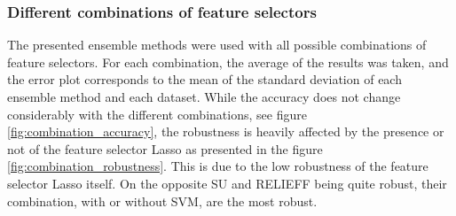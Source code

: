 \documentclass[twoside,11pt]{article}
\begin{document}

\subsubsection{Different combinations of feature selectors}
The presented ensemble methods were used with all possible combinations of feature selectors. For each combination, the average of the results was taken, and the error plot corresponds to the mean of the standard deviation of each ensemble method and each dataset. While the accuracy does not change considerably with the different combinations, see figure \ref{fig:combination_accuracy}, the robustness is heavily affected by the presence or not of the feature selector Lasso as presented in the figure \ref{fig:combination_robustness}. This is due to the low robustness of the feature selector Lasso itself. On the opposite SU and RELIEFF being quite robust, their combination, with or without SVM, are the most robust.  
\end{document}

